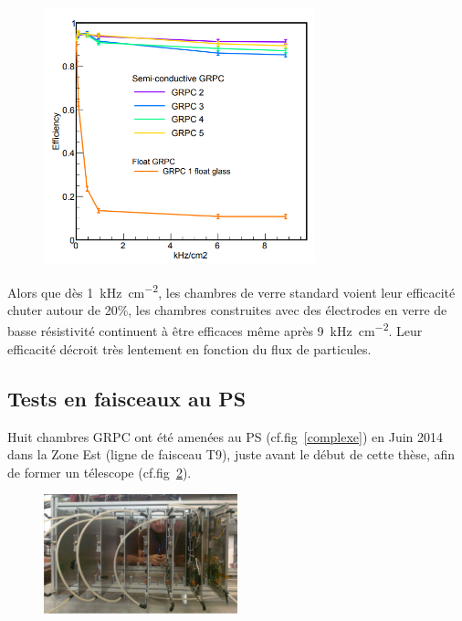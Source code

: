 \begin{figure}[ht!]
	\centering
	\includegraphics[width=0.7\textwidth]{GLA/effiDesy.png}
	\label{effiDesy}
\end{figure}

Alors que dès \SI{1}{\kilo\hertz\per\square\centi\meter}, les chambres de verre standard voient leur efficacité chuter autour de 20\%, les chambres construites avec des électrodes en verre de basse résistivité continuent à être efficaces même après \SI{9}{\kilo\hertz\per\square\centi\meter}. Leur efficacité décroit très lentement en fonction du flux de particules.

\subsection{Tests en faisceaux au PS}
Huit chambres GRPC ont été amenées au PS (cf.fig~\ref{complexe}) en Juin \num{2014} dans la Zone Est (ligne de faisceau T9), juste avant le début de cette thèse, afin de former un télescope (cf.fig~\ref{TelescopePS}).

\begin{figure}[ht!]
	\centering
	\includegraphics[width=0.50\textwidth]{GLA/TelescopePS.png}
	\label{TelescopePS}
\end{figure}

